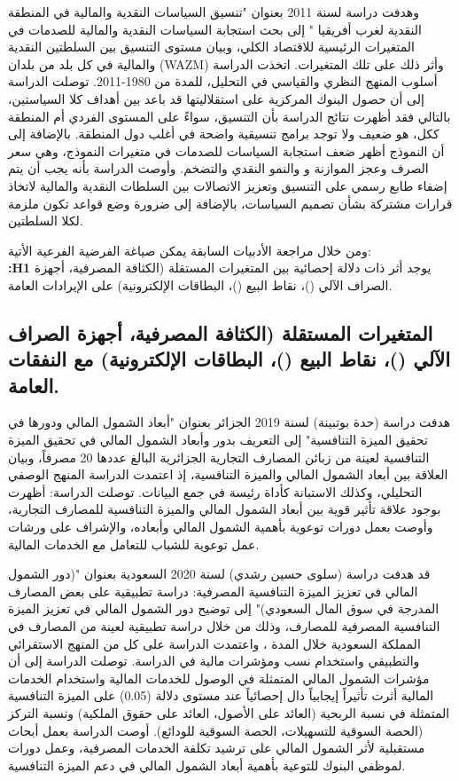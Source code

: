 \documentclass[10pt,a4paper]{report}
\begin{document}
\begin{doublespacing}
وهدفت دراسة  لسنة 2011 بعنوان "تنسيق السياسات النقدية والمالية في المنطقة النقدية لغرب أفريقيا " إلى بحث استجابة السياسات النقدية والمالية للصدمات في المتغيرات الرئيسية للاقتصاد الكلي، وبيان مستوى التنسيق بين السلطتين النقدية والمالية في كل بلد من بلدان {(WAZM)} وأثر ذلك على تلك المتغيرات. اتخذت الدراسة أسلوب المنهج النظري والقياسي في التحليل، للمدة من 1980-2011. توصلت الدراسة إلى أن حصول البنوك المركزية على استقلاليتها قد باعد بين أهداف كلا السياستين، بالتالي فقد أظهرت نتائج الدراسة بأن التنسيق، سواءً على المستوى الفردي أم المنطقة ككل، هو ضعيف ولا توجد برامج تنسيقية واضحة في أغلب دول المنطقة. بالإضافة إلى أن النموذج أظهر ضعف استجابة السياسات للصدمات في متغيرات النموذج، وهي سعر الصرف وعجز الموازنة و والنمو النقدي والتضخم. وأوصت الدراسة بأنه يجب أن يتم إضفاء طابع رسمي على التنسيق وتعزيز الاتصالات بين السلطات النقدية والمالية لاتخاذ قرارات مشتركة بشأن تصميم السياسات، بالإضافة إلى ضرورة وضع قواعد تكون ملزمة لكلا السلطتين.

ومن خلال مراجعة الأدبيات السابقة يمكن صياغة الفرضية الفرعية الأتية:\\
\textbf{:H1} يوجد أثر ذات دلالة إحصائية بين المتغيرات المستقلة ({الكثافة المصرفية}، {أجهزة الصراف الآلي} ()، {نقاط البيع} ()، {البطاقات الإلكترونية}) على الإيرادات العامة.
\subsection{المتغيرات المستقلة ({الكثافة المصرفية}، {أجهزة الصراف الآلي} ()، {نقاط البيع} ()، {البطاقات الإلكترونية}) مع النفقات العامة.
}
هدفت دراسة (حدة بوتبينة) لسنة 2019 الجزائر بعنوان "أبعاد الشمول المالي ودورها في تحقيق الميزة التنافسية" إلى التعريف بدور وأبعاد الشمول المالي في تحقيق الميزة التنافسية لعينة من زبائن المصارف التجارية الجزائرية البالغ عددها 20 مصرفاً، وبيان العلاقة بين أبعاد الشمول المالي والميزة التنافسية، إذ اعتمدت الدراسة المنهج الوصفي التحليلي، وكذلك الاستبانة كأداة رئيسة في جمع البيانات. توصلت الدراسة: أظهرت بوجود علاقة تأثير قوية بين أبعاد الشمول المالي والميزة التنافسية للمصارف التجارية، وأوصت بعمل دورات توعوية بأهمية الشمول المالي وأبعاده، والإشراف على ورشات عمل توعوية للشباب للتعامل مع الخدمات المالية. 

قد هدفت دراسة (سلوى حسين رشدي) لسنة 2020 السعودية بعنوان "(دور الشمول المالي في تعزيز الميزة التنافسية المصرفية: دراسة تطبيقية على بعض المصارف المدرجة في سوق المال السعودي)" إلى توضيح دور الشمول المالي في تعزيز الميزة التنافسية المصرفية للمصارف، وذلك من خلال دراسة تطبيقية لعينة من المصارف في المملكة السعودية خلال المدة ، واعتمدت الدراسة على كل من المنهج الاستقرائي والتطبيقي واستخدام نسب ومؤشرات مالية في الدراسة. توصلت الدراسة إلى أن مؤشرات الشمول المالي المتمثلة في الوصول للخدمات المالية واستخدام الخدمات المالية أثرت تأثيراً إيجابياً دال إحصائياً عند مستوى دلالة (0.05) على الميزة التنافسية المتمثلة في نسبة الربحية (العائد على الأصول، العائد على حقوق الملكية) ونسبة التركز (الحصة السوقية للتسهيلات، الحصة السوقية للودائع). أوصت الدراسة بعمل أبحاث مستقبلية لأثر الشمول المالي على ترشيد تكلفة الخدمات المصرفية، وعمل دورات لموظفي البنوك للتوعية بأهمية أبعاد الشمول المالي في دعم الميزة التنافسية. 


\end{doublespacing}
\end{document}
